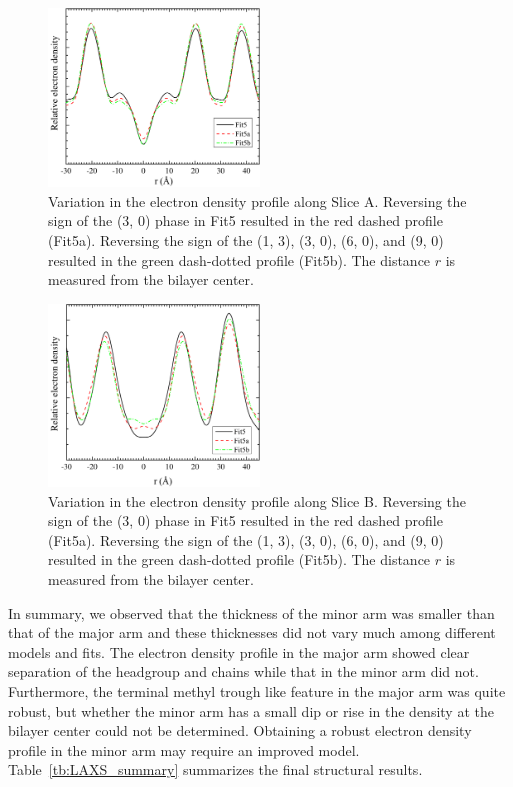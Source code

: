 \begin{figure}[htbp]
  \centering
  \includegraphics[width=0.5\textwidth]{figures/ripple/LAXS/major_phase_variation}
  \caption{Variation in the electron density profile along Slice A. 
  Reversing the sign of the (3, 0) phase in Fit5 
  resulted in the red dashed profile (Fit5a). Reversing the sign of the 
  (1, 3), (3, 0), (6, 0), and (9, 0) resulted in the green dash-dotted profile
  (Fit5b). The distance $r$ is measured from the bilayer center.}
  \label{fig:major_phase_variation}
\end{figure}

\begin{figure}[htbp]
  \centering
  \includegraphics[width=0.5\textwidth]{figures/ripple/LAXS/minor_phase_variation}
  \caption{Variation in the electron density profile along Slice B.
  Reversing the sign of the (3, 0) phase in Fit5 
  resulted in the red dashed profile (Fit5a). Reversing the sign of the 
  (1, 3), (3, 0), (6, 0), and (9, 0) resulted in the green dash-dotted profile
  (Fit5b). The distance $r$ is measured from the bilayer center.}
  \label{fig:minor_phase_variation}
\end{figure}

In summary, we observed that the thickness of the minor arm was 
smaller than that of the major arm and these thicknesses did not vary 
much among different models and fits. 
The electron density profile in the major 
arm showed clear separation of the headgroup and chains while that in the minor 
arm did not. 
Furthermore, the terminal methyl trough like feature in the major arm was 
quite robust, but 
whether the minor arm has a small dip or rise in the density at the bilayer center
could not be determined. Obtaining a robust electron density profile in the minor
arm may require an improved model. Table~\ref{tb:LAXS_summary} summarizes
the final structural results.

